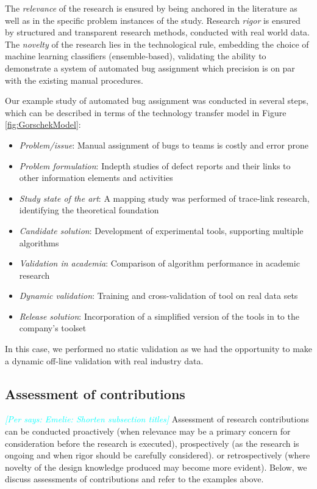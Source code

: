 \documentclass[graybox]{svmult}
\newcommand{\per}[1]{\textcolor{cyan}{{\it [Per says: #1]}}}
\newcommand{\per}[1]{}
\begin{document}
The \emph{relevance} of the research is ensured by being anchored in the literature as well as in the specific problem instances of the study. Research \emph{rigor} is ensured by structured and transparent research methods, conducted with real world data. The \emph{novelty} of the research lies in the technological rule, embedding the choice of machine learning classifiers (ensemble-based), validating the ability to demonstrate a system of automated bug assignment which precision is on par with the existing manual procedures.

Our example study of automated bug assignment was conducted in several steps, which can be described in terms of the technology transfer model in Figure \ref{fig:GorschekModel}:
\begin{itemize}
\item \emph{Problem/issue}: Manual assignment of bugs to teams is costly and error prone
\item \emph{Problem formulation}: Indepth studies of defect reports and their links to other information elements and activities
\item \emph{Study state of the art}: A mapping study was performed of trace-link research, identifying the theoretical foundation \cite{Borg2013EMSE}
\item \emph{Candidate solution}: Development of experimental tools, supporting multiple algorithms
\item \emph{Validation in academia}: Comparison of algorithm performance in academic research \cite{BorgESEM13}
\item \emph{Dynamic validation}: Training and cross-validation of tool on real data sets \cite{JonssonBug15}
\item \emph{Release solution}: Incorporation of a simplified version of the tools in to the company's toolset
\end{itemize} 

In this case, we performed no static validation as we had the opportunity to make a dynamic off-line validation with real industry data.



\subsection{Assessment of contributions}
\label{sec:assessment}

\per{Emelie: Shorten subsection titles}
Assessment of research contributions can be conducted proactively (when relevance may be a primary concern for consideration before the research is executed), prospectively (as the research is ongoing and when rigor should be carefully considered). or retrospectively (where novelty of the design knowledge produced may become more evident).
Below, we discuss assessments of contributions and refer to the examples above.
\end{document}
